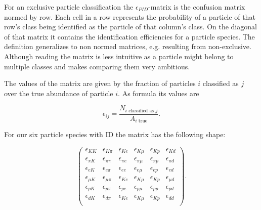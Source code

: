 For an exclusive particle classification the $\epsilon_{PID}$-matrix is the confusion matrix normed by row. Each cell in a row represents the probability of a particle of that row's class being identified as the particle of that column's class. On the diagonal of that matrix it contains the identification efficiencies for a particle species.
The definition generalizes to non normed matrices, e.g. resulting from non-exclusive. Although reading the matrix is less intuitive as a particle might belong to multiple classes and makes comparing them very ambitious.

The values of the matrix are given by the fraction of particles $i$ classified as $j$ over the true abundance of particle $i$. As formula its values are

\begin{equation}
    \epsilon_{i j} = \frac{N_{i \text{ classified as } j}}{A_{i \text{ true}}}.
\end{equation}

For our six particle species with ID the matrix has the following shape:

\begin{equation}
    \begin{pmatrix}
        \epsilon_{K K} & \epsilon_{K \pi} & \epsilon_{K e} & \epsilon_{K \mu} & \epsilon_{K p} & \epsilon_{K d} \\
        \epsilon_{\pi K} & \epsilon_{\pi \pi} & \epsilon_{\pi e} & \epsilon_{\pi \mu} & \epsilon_{\pi p} & \epsilon_{\pi d} \\
        \epsilon_{e K} & \epsilon_{e \pi} & \epsilon_{e e} & \epsilon_{e \mu} & \epsilon_{e p} & \epsilon_{e d} \\
        \epsilon_{\mu K} & \epsilon_{\mu \pi} & \epsilon_{K e} & \epsilon_{K \mu} & \epsilon_{K p} & \epsilon_{\mu d} \\
        \epsilon_{p K} & \epsilon_{p \pi} & \epsilon_{p e} & \epsilon_{p \mu} & \epsilon_{p p} & \epsilon_{p d} \\
        \epsilon_{d K} & \epsilon_{d \pi} & \epsilon_{K e} & \epsilon_{K \mu} & \epsilon_{K p} & \epsilon_{d d} \\
    \end{pmatrix}.
\end{equation}
